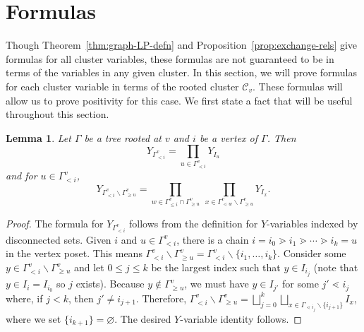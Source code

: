 \documentclass[pdftex]{sigma}
\numberwithin{equation}{section}
\newtheorem{Lemma}[Theorem]{Lemma}
\newcommand{\calC}{\mathcal{C}}
\begin{document}
\section{Formulas}\label{sec:formulas}
Though Theorem~\ref{thm:graph-LP-defn} and Proposition~\ref{prop:exchange-rels} give formulas for all cluster variables, these formulas are not guaranteed to be in terms of the variables in any given cluster. In this section, we will prove formulas for each cluster variable in terms of the rooted cluster $\calC_v$. These formulas will allow us to prove positivity for this case.
We first state a fact that will be useful throughout this section.
\begin{Lemma}
\label{lem:in-cluster}
Let $\Gamma$ be a tree rooted at $v$ and $i$ be a vertex of $\Gamma$. Then \[Y_{\Gamma_{< i}^v}=\prod_{u\in\Gamma_{\lessdot i}^v}Y_{I_u}\]
and for $u\in\Gamma_{< i}^v$,
\[ Y_{\Gamma_{< i}^v \backslash \Gamma_{\geq u}^v} = \prod_{w \in \Gamma_{\leq i}^v \cap \Gamma_{\geq u}^{v}} ~\prod_{x \in \Gamma_{\lessdot w}^{v} \backslash \Gamma_{\geq u}^{v}} Y_{I_{x}}. \]
\end{Lemma}
\begin{proof}
The formula for $Y_{\Gamma_{< i}^v}$ follows from the definition for $Y$-variables indexed by disconnected sets.
Given $i$ and $u \in \Gamma_{< i}^{v}$, there is a chain $i = i_0 \gtrdot i_1 \gtrdot \cdots \gtrdot i_k = u$ in the vertex poset. This means $\Gamma_{< i}^v \backslash \Gamma_{\geq u}^v = \Gamma_{< i}^v \backslash \{ i_1, \dots, i_k \}.$ Consider some $y \in \Gamma_{< i}^v \backslash \Gamma_{\geq u}^v$ and let $0 \leq j \leq k$ be the largest index such that $y \in I_{i_j}$ (note that $y\in I_i=I_{i_0}$ so $j$ exists). Because $y \not\in \Gamma_{\geq u}^v$, we must have $y \in I_{j'}$ for some $j' \lessdot i_j$ where, if $j < k$, then $j' \neq i_{j+1}$.
Therefore, $\Gamma_{< i}^v \backslash \Gamma_{\geq u}^v = \bigsqcup_{j = 0}^k \bigsqcup_{x \in \Gamma_{\lessdot i_j} \backslash \{ i_{j+1} \}} I_{x}$, where we set $\{i_{k+1}\} = \varnothing$. The desired $Y$-variable identity follows.
\end{proof}
\end{document}
